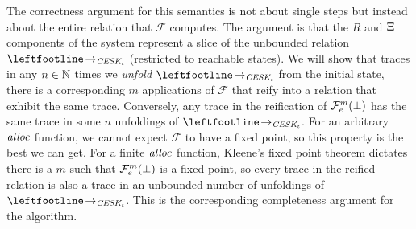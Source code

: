 The correctness argument for this semantics is not about single steps but instead about the entire relation that ${\mathcal F}$ computes.
%
The argument is that the $R$ and $\Xi$ components of the system represent a slice of the unbounded relation $\stepto_{\CESKt}$ (restricted to reachable states).
%
We will show that traces in any $n \in {\mathbb N}$ times we \emph{unfold} $\stepto_{\CESKt}$ from the initial state, there is a corresponding $m$ applications of ${\mathcal F}$ that reify into a relation that exhibit the same trace.
%
Conversely, any trace in the reification of ${\mathcal F}_{e}^m(\bot)$ has the same trace in some $n$ unfoldings of $\stepto_{\CESKt}$.
%
For an arbitrary $\mathit{alloc}$ function, we cannot expect ${\mathcal F}$ to have a fixed point, so this property is the best we can get.
%
For a finite $\mathit{alloc}$ function, Kleene's fixed point theorem dictates there is a $m$ such that ${\mathcal F}_{e}^m(\bot)$ is a fixed point, so every trace in the reified relation is also a trace in an unbounded number of unfoldings of $\stepto_{\CESKt}$.
%
This is the corresponding completeness argument for the algorithm.


